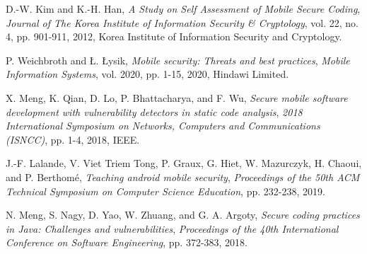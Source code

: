 \documentclass[conference]{IEEEtran}
\begin{document}



%
%
%

\begin{thebibliography}{1}

D.-W. Kim and K.-H. Han,
\textit{A Study on Self Assessment of Mobile Secure Coding},
\textit{Journal of The Korea Institute of Information Security \& Cryptology},
vol. 22, no. 4, pp. 901-911, 2012, Korea Institute of Information Security and Cryptology.

P. Weichbroth and Ł. Łysik,
\textit{Mobile security: Threats and best practices},
\textit{Mobile Information Systems},
vol. 2020, pp. 1-15, 2020, Hindawi Limited.

X. Meng, K. Qian, D. Lo, P. Bhattacharya, and F. Wu,
\textit{Secure mobile software development with vulnerability detectors in static code analysis},
\textit{2018 International Symposium on Networks, Computers and Communications (ISNCC)},
pp. 1-4, 2018, IEEE.

J.-F. Lalande, V. Viet Triem Tong, P. Graux, G. Hiet, W. Mazurczyk, H. Chaoui, and P. Berthomé,
\textit{Teaching android mobile security},
\textit{Proceedings of the 50th ACM Technical Symposium on Computer Science Education},
pp. 232-238, 2019.

N. Meng, S. Nagy, D. Yao, W. Zhuang, and G. A. Argoty,
\textit{Secure coding practices in Java: Challenges and vulnerabilities},
\textit{Proceedings of the 40th International Conference on Software Engineering},
pp. 372-383, 2018.


\end{thebibliography}
\end{document}
